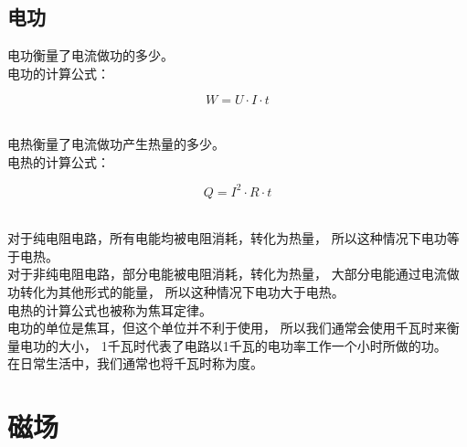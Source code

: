 \documentclass[UTF8]{ctexart}
\begin{document}
\subsection{电功}
    电功衡量了电流做功的多少。\\[3mm]
    电功的计算公式：
    \begin{large}
        \begin{equation*}
            W=U\cdot I\cdot t
        \end{equation*}
    \end{large}\\
    电热衡量了电流做功产生热量的多少。\\[3mm]
    电热的计算公式：
    \begin{large}
        \begin{equation*}
            Q=I^2\cdot R\cdot t
        \end{equation*}
    \end{large}\\
    对于纯电阻电路，所有电能均被电阻消耗，转化为热量，
    所以这种情况下电功等于电热。\\[3mm]
    对于非纯电阻电路，部分电能被电阻消耗，转化为热量，
    大部分电能通过电流做功转化为其他形式的能量，
    所以这种情况下电功大于电热。\\[3mm]
    电热的计算公式也被称为焦耳定律。\\[3mm]
    电功的单位是焦耳，但这个单位并不利于使用，
    所以我们通常会使用千瓦时来衡量电功的大小，
    1千瓦时代表了电路以1千瓦的电功率工作一个小时所做的功。\\[3mm]
    在日常生活中，我们通常也将千瓦时称为度。

\newpage

\section{磁场}
\end{document}
